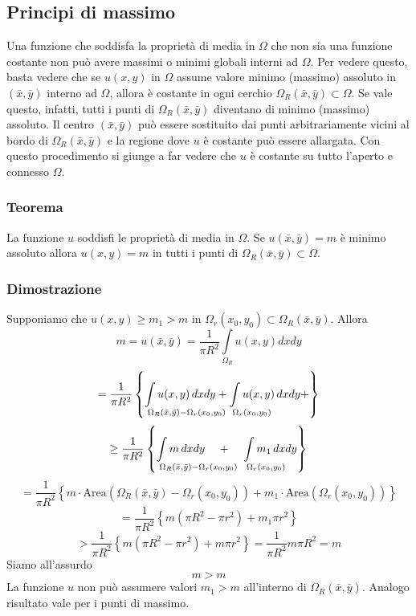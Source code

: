 \subsection{Principi di massimo}
Una funzione che soddisfa la propriet\`a di media in $\Omega$ che non sia
una funzione costante non pu\`o avere massimi o minimi globali interni ad $\Omega$.
Per vedere questo, basta vedere che se $u(x,y)$ in $\Omega$ assume valore
minimo (massimo) assoluto in $(\bar{x}, \bar{y})$ interno ad $\Omega$, 
allora \`e costante in ogni cerchio $\Omega_R(\bar{x}, \bar{y})\subset \Omega$.
Se vale questo, infatti, tutti i punti di $\Omega_R(\bar{x}, \bar{y})$ diventano
di minimo (massimo) assoluto.
Il centro $(\bar{x}, \bar{y})$ pu\`o essere sostituito dai punti arbitrariamente
vicini al bordo di $\Omega_R(\bar{x}, \bar{y})$ e la regione dove $u$ \`e costante
pu\`o essere allargata.
Con questo procedimento si giunge a far vedere che $u$ \`e costante su tutto
l'aperto e connesso $\Omega$.
\subsubsection{Teorema}
La  funzione $u$ soddisfi le propriet\`a di media in $\Omega$.
Se $u(\bar{x}, \bar{y})=m$ \`e minimo assoluto allora $u(x,y)=m$ in tutti
i punti di $\Omega_R(\bar{x}, \bar{y})\subset \Omega$.
\subsubsection{Dimostrazione}
Supponiamo che $u(x,y)\geq m_1 > m$ in $\Omega_r (x_0, y_0)\subset \Omega_R (\bar{x}, \bar{y})$.
Allora
\[
	m= u(\bar{x}, \bar{y})=
	\frac{1}{\pi R^2}
	\int \limits_{\Omega_R} u(x,y) dx dy
\]
\[
	= \frac{1}{\pi R^2} \left\{
	\int \limits_{\mathrlap{\Omega_R (\bar{x}, \bar{y}) - \Omega_r (x_0,y_0)}}
	u(x,y) \, dxdy + 
	\int \limits_{\mathrlap{\Omega_r (x_0,y_0)}}
	u(x,y) \, dxdy + 
	\right\}
\]
\[
	\geq \frac{1}{\pi R^2} \left\{
	\int \limits_{\mathrlap{\Omega_R (\bar{x}, \bar{y}) - \Omega_r (x_0,y_0)}}
	m \, dxdy \;\;\;\; + \;\;\;\;
	\int \limits_{\mathrlap{\Omega_r (x_0,y_0)}}
	m_1 \, dxdy
	\right\}
\]
\[
	= \frac{1}{\pi R^2} \left\{
	m \cdot \text{Area} \left( \Omega_R (\bar{x}, \bar{y}) - \Omega_r (x_0,y_0) \right) +
	m_1 \cdot \text{Area} \left(\Omega_r (x_0,y_0) \right)
	\right\} 
\]
\[
	= \frac{1}{\pi R^2} \left\{
	m (\pi R^2 - \pi r^2) + m_1 \pi r^2
	\right\} 
\]
\[
	> \frac{1}{\pi R^2} \left\{
	m (\pi R^2 - \pi r^2) + m \pi r^2
	\right\} =
	\frac{1}{\pi R^2} m\pi R^2 = m
\]
Siamo all'assurdo
\[
	m>m
\]
La funzione $u$ non pu\`o assumere valori $m_1>m$ all'interno di 
$\Omega_R(\bar{x}, \bar{y})$.
Analogo risultato vale per i punti di massimo.
